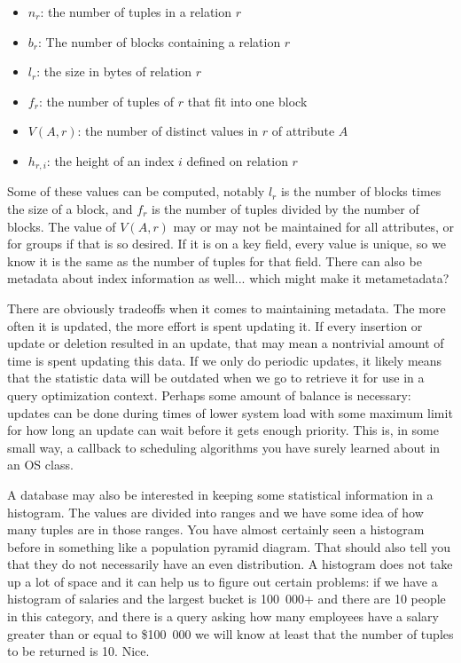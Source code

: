 \begin{itemize}
	\item $n_{r}$: the number of tuples in a relation $r$ 
	\item $b_{r}$: The number of blocks containing a relation $r$ 
	\item $l_{r}$: the size in bytes of relation $r$
	\item $f_{r}$: the number of tuples of $r$ that fit into one block
	\item $V(A, r)$: the number of distinct values in $r$ of attribute $A$
	\item $h_{r, i}$: the height of an index $i$ defined on relation $r$
\end{itemize}

Some of these values can be computed, notably $l_{r}$ is the number of blocks times the size of a block, and $f_{r}$ is the number of tuples divided by the number of blocks. The value of $V(A, r)$ may or may not be maintained for all attributes, or for groups if that is so desired. If it is on a key field, every value is unique, so we know it is the same as the number of tuples for that field. There can also be metadata about index information as well... which might make it metametadata? 

There are obviously tradeoffs when it comes to maintaining metadata. The more often it is updated, the more effort is spent updating it. If every insertion or update or deletion resulted in an update, that may mean a nontrivial amount of time is spent updating this data. If we only do periodic updates, it likely means that the statistic data will be outdated when we go to retrieve it for use in a query optimization context. Perhaps some amount of balance is necessary: updates can be done during times of lower system load with some maximum limit for how long an update can wait before it gets enough priority. This is, in some small way, a callback to scheduling algorithms you have surely learned about in an OS class. 

A database may also be interested in keeping some statistical information in a histogram. The values are divided into ranges and we have some idea of how many tuples are in those ranges. You have almost certainly seen a histogram before in something like a population pyramid diagram. That should also tell you that they do not necessarily have an even distribution. A histogram does not take up a lot of space and it can help us to figure out certain problems: if we have a histogram of salaries and the largest bucket is 100~000+ and there are 10 people in this category, and there is a query asking how many employees have a salary greater than or equal to \$100~000 we will know at least that the number of tuples to be returned is 10. Nice.

